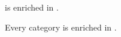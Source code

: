 %

\begin{example}
    \Category is enriched in \Category.
\end{example}

\begin{example}
    Every category is enriched in \Set.
\end{example}

